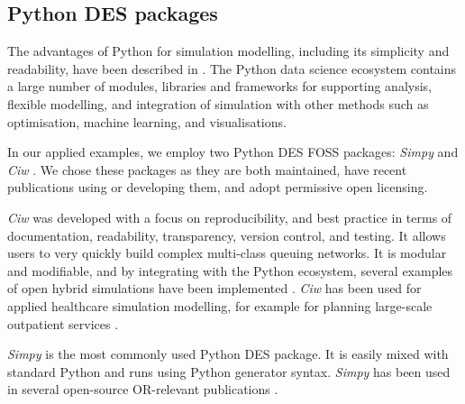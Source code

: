 \documentclass[]{interact}
\theoremstyle{plain}%
\theoremstyle{definition}
\theoremstyle{remark}
\begin{document}
\subsection{Python DES packages}

The advantages of Python for simulation modelling, including its simplicity and readability, have been described in \cite{dagkakis2016review}. The Python data science ecosystem contains a large number of modules, libraries and frameworks for supporting analysis, flexible modelling, and integration of simulation with other methods such as optimisation, machine learning, and visualisations. 

In our applied examples, we employ two Python DES FOSS packages: \textit{Simpy} \citep{simpy} and \textit{Ciw} \citep{ciw}.  We chose these packages as they are both maintained, have recent publications using or developing them, and adopt permissive open licensing.

\textit{Ciw} was developed with a focus on reproducibility, and best practice in terms of documentation, readability, transparency, version control, and testing. It allows users to very quickly build complex multi-class queuing networks. It is modular and modifiable, and by integrating with the Python ecosystem, several examples of open hybrid simulations have been implemented \citep{palmer2023implementing, palmer_geraint_2021_4601529}. \textit{Ciw} has been used for applied healthcare simulation modelling, for example for planning large-scale outpatient services \citep{zou2022impact}. 

\textit{Simpy} is the most commonly used Python DES package. It is easily mixed with standard Python and runs using Python generator syntax.  \textit{Simpy} has been used in several open-source OR-relevant publications \citep{allen_simulation_2020, Chalke043795, harper2023post, lim2020staff, cubukcuoglu2020discrete}.



\end{document}
